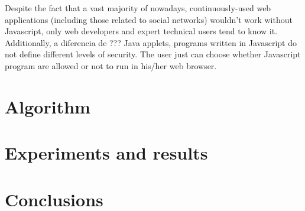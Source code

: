 \documentclass{llncs}
\begin{document}
Despite the fact that a vast majority of nowadays, continuously-used web applications (including those related to social networks) wouldn't work without Javascript, only web developers and expert technical users tend to know it. Additionally, a diferencia de ??? Java applets, programs written in Javascript do not define different levels of security. The user just can choose whether Javascript program are allowed or not to run in his/her web browser. 

\section{Algorithm}
\section{Experiments and results}
\section{Conclusions}
%
%
\begin{thebibliography}{}
%


\end{thebibliography}
%
\end{document}
